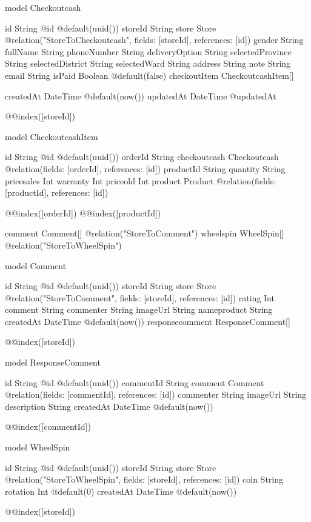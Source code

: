 model Checkoutcash {
  id               String             @id @default(uuid())
  storeId          String
  store            Store              @relation("StoreToCheckoutcash", fields: [storeId], references: [id])
  gender           String
  fullName         String
  phoneNumber      String
  deliveryOption   String
  selectedProvince String
  selectedDistrict String
  selectedWard     String
  address          String
  note             String
  email            String
  isPaid           Boolean            @default(false)
  checkoutItem     CheckoutcashItem[]

  createdAt DateTime @default(now())
  updatedAt DateTime @updatedAt

  @@index([storeId])
}

model CheckoutcashItem {
  id           String       @id @default(uuid())
  orderId      String
  checkoutcash Checkoutcash @relation(fields: [orderId], references: [id])
  productId    String
  quantity     String
  pricesales   Int
  warranty     Int
  priceold     Int
  product      Product      @relation(fields: [productId], references: [id])

  @@index([orderId])
  @@index([productId])
}



comment Comment[] @relation("StoreToComment")
wheelspin WheelSpin[] @relation("StoreToWheelSpin")





model Comment {
  id               String            @id @default(uuid())
  storeId         String
  store           Store         @relation("StoreToComment", fields: [storeId], references: [id])
  rating           Int
  comment          String
  commenter        String
  imageUrl         String
  nameproduct      String
  createdAt        DateTime          @default(now())
  responsecomment  ResponseComment[]

  @@index([storeId])
}

model ResponseComment {
  id          String   @id @default(uuid())
  commentId   String
  comment     Comment  @relation(fields: [commentId], references: [id])
  commenter   String
  imageUrl    String
  description String
  createdAt   DateTime @default(now())

  @@index([commentId])
}

model WheelSpin {
  id               String         @id @default(uuid())
  storeId         String
  store           Store         @relation("StoreToWheelSpin", fields: [storeId], references: [id])
  coin             String
  rotation         Int            @default(0)
  createdAt        DateTime       @default(now())

  @@index([storeId])
}